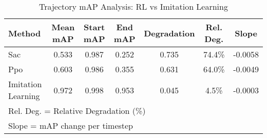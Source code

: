 
\begin{table}[htbp]
\centering
\caption{Trajectory mAP Analysis: RL vs Imitation Learning}
\label{tab:map_trajectory_analysis}
\begin{tabular}{lcccccc}
\toprule
Method & Mean mAP & Start mAP & End mAP & Degradation & Rel. Deg. & Slope \\
\midrule

Sac & 0.533 & 0.987 & 0.252 & 0.735 & 74.4\% & -0.0058 \\
Ppo & 0.603 & 0.986 & 0.355 & 0.631 & 64.0\% & -0.0049 \\
Imitation Learning & 0.972 & 0.998 & 0.953 & 0.045 & 4.5\% & -0.0003 \\

\bottomrule
\multicolumn{7}{l}{\footnotesize Rel. Deg. = Relative Degradation (\%)} \\
\multicolumn{7}{l}{\footnotesize Slope = mAP change per timestep} \\
\end{tabular}
\end{table}
